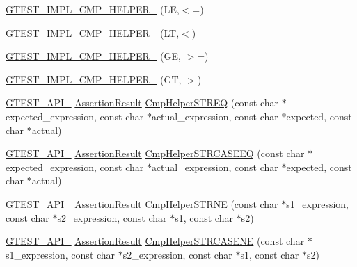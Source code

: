 \begin{DoxyCompactItemize}
\item 
\hyperlink{namespacetesting_1_1internal_ade60646b18728043fff84d7b4125de2c}{G\+T\+E\+S\+T\+\_\+\+I\+M\+P\+L\+\_\+\+C\+M\+P\+\_\+\+H\+E\+L\+P\+E\+R\+\_\+} (L\+E,$<$=)
\item 
\hyperlink{namespacetesting_1_1internal_aabcbff15eac496f8487699d19f42c274}{G\+T\+E\+S\+T\+\_\+\+I\+M\+P\+L\+\_\+\+C\+M\+P\+\_\+\+H\+E\+L\+P\+E\+R\+\_\+} (L\+T,$<$)
\item 
\hyperlink{namespacetesting_1_1internal_af969886067930ce70f6405cd5aa8b06b}{G\+T\+E\+S\+T\+\_\+\+I\+M\+P\+L\+\_\+\+C\+M\+P\+\_\+\+H\+E\+L\+P\+E\+R\+\_\+} (G\+E, $>$=)
\item 
\hyperlink{namespacetesting_1_1internal_a7fdb4fc164db83c51dfad17640bfeae9}{G\+T\+E\+S\+T\+\_\+\+I\+M\+P\+L\+\_\+\+C\+M\+P\+\_\+\+H\+E\+L\+P\+E\+R\+\_\+} (G\+T, $>$)
\item 
\hyperlink{gtest-port_8h_aa73be6f0ba4a7456180a94904ce17790}{G\+T\+E\+S\+T\+\_\+\+A\+P\+I\+\_\+} \hyperlink{classtesting_1_1_assertion_result}{Assertion\+Result} \hyperlink{namespacetesting_1_1internal_a11ff4bc46dddd8bb07c0e247a603695d}{Cmp\+Helper\+S\+T\+R\+E\+Q} (const char $\ast$expected\+\_\+expression, const char $\ast$actual\+\_\+expression, const char $\ast$expected, const char $\ast$actual)
\item 
\hyperlink{gtest-port_8h_aa73be6f0ba4a7456180a94904ce17790}{G\+T\+E\+S\+T\+\_\+\+A\+P\+I\+\_\+} \hyperlink{classtesting_1_1_assertion_result}{Assertion\+Result} \hyperlink{namespacetesting_1_1internal_a802d9586d870a90e6a850953c167654d}{Cmp\+Helper\+S\+T\+R\+C\+A\+S\+E\+E\+Q} (const char $\ast$expected\+\_\+expression, const char $\ast$actual\+\_\+expression, const char $\ast$expected, const char $\ast$actual)
\item 
\hyperlink{gtest-port_8h_aa73be6f0ba4a7456180a94904ce17790}{G\+T\+E\+S\+T\+\_\+\+A\+P\+I\+\_\+} \hyperlink{classtesting_1_1_assertion_result}{Assertion\+Result} \hyperlink{namespacetesting_1_1internal_af2d31c77ce73e1003a64bd7ca3564bbe}{Cmp\+Helper\+S\+T\+R\+N\+E} (const char $\ast$s1\+\_\+expression, const char $\ast$s2\+\_\+expression, const char $\ast$s1, const char $\ast$s2)
\item 
\hyperlink{gtest-port_8h_aa73be6f0ba4a7456180a94904ce17790}{G\+T\+E\+S\+T\+\_\+\+A\+P\+I\+\_\+} \hyperlink{classtesting_1_1_assertion_result}{Assertion\+Result} \hyperlink{namespacetesting_1_1internal_a7e31d489f06ab8f6a81a7729f0c377e7}{Cmp\+Helper\+S\+T\+R\+C\+A\+S\+E\+N\+E} (const char $\ast$s1\+\_\+expression, const char $\ast$s2\+\_\+expression, const char $\ast$s1, const char $\ast$s2)

\end{DoxyCompactItemize}
